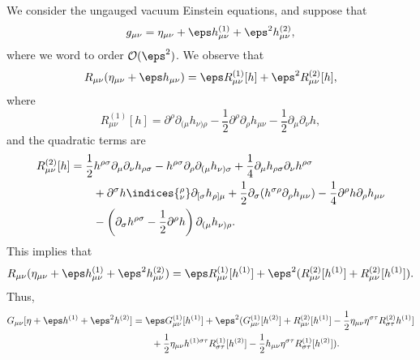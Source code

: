 \documentclass[12pt]{article}
\begin{document}
We consider the ungauged vacuum Einstein equations, and suppose that
\[
g_{\mu\nu} = \eta_{\mu\nu} + \eps h_{\mu\nu}^{(1)} + \eps^2 h_{\mu\nu}^{(2)},
\]
where we word to order $\mathcal{O}(\eps^2)$. We observe that
\[
	R_{\mu\nu}(\eta_{\mu\nu} + \eps h_{\mu\nu}) = \eps R_{\mu\nu}^{(1)}[h] + \eps^2 R_{\mu\nu}^{(2)}[h],
\]
where
\[
	R_{\mu\nu}^{(1)}[h] = \partial^\rho \partial_{(\mu} h_{\nu) \rho} - \frac 12 \partial^\rho \partial_\rho h_{\mu\nu} - \frac 12 \partial_\mu \partial_\nu h,
\]
and the quadratic terms are
\begin{align*}
	R_{\mu\nu}^{(2)}[h] &= \frac 12 h^{\rho\sigma}\partial_\mu \partial_\nu h_{\rho\sigma} - h^{\rho\sigma} \partial_\rho \partial_{(\mu} h_{\nu) \sigma} + \frac 14 \partial_\mu h_{\rho\sigma} \partial_\nu h^{\rho\sigma} \\
			    &\qquad + \partial^\sigma h\indices{^{\rho}_{\nu}} \partial_{[\sigma} h_{\rho]\mu} + \frac 12 \partial_\sigma (h^{\sigma\rho} \partial_\rho h_{\mu\nu} ) - \frac 14 \partial^\rho h \partial_\rho h_{\mu\nu} \\
			    & \qquad - \left(\partial_\sigma h^{\rho\sigma} - \frac 12 \partial^\rho h\right) \partial_{(\mu} h_{\nu)\rho}.
\end{align*}
This implies that
\[
	R_{\mu\nu}(\eta_{\mu\nu} + \eps h_{\mu\nu}^{(1)} + \eps^2 h_{\mu\nu}^{(2)}) = \eps R_{\mu\nu}^{(1)} [h^{(1)}] + \eps^2 (R_{\mu\nu}^{(2)} [h^{(1)}] + R_{\mu\nu}^{(2)} [h^{(1)}] ).
\]
Thus,
\begin{align*}
	G_{\mu\nu}[\eta + \eps h^{(1)} + \eps^2 h^{(2)}] &= \eps G_{\mu\nu}^{(1)} [h^{(1)}] + \eps^2 (G_{\mu\nu}^{(1)}[h^{(2)}] + R_{\mu\nu}^{(2)}[h^{(1)}] - \frac 12 \eta_{\mu\nu} \eta^{\sigma\tau} R_{\sigma\tau}^{(2)} h^{(1)}]  \\
							 & \qquad + \frac 12 \eta_{\mu\nu} h^{(1) \sigma \tau} R^{(1)}_{\sigma\tau} [h^{(2)}] - \frac 12 h_{\mu\nu} \eta^{\sigma\tau} R_{\sigma\tau}^{(1)} [h^{(2)}]).
\end{align*}
\end{document}
